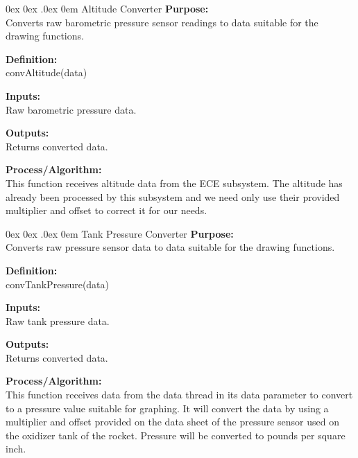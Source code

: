 \documentclass[10pt,draftclsnofoot,onecolumn,compsoc]{IEEEtran}
\makeatletter
\renewcommand\paragraph{\@startsection{paragraph}{4}{\z@}%
                                    {0ex \@plus0ex \@minus.0ex}%
                                    {0em}%
                                    {\normalfont\normalsize\bfseries}}
\makeatother
\begin{document}
\paragraph{Altitude Converter}
{\bf Purpose:} \\
Converts raw barometric pressure sensor readings to data suitable for the drawing functions.  \par
{\bf Definition:} \\ 
convAltitude(data) \par
{\bf Inputs:} \\ Raw barometric pressure data. \par
{\bf Outputs:} \\ Returns converted data. \par
{\bf Process/Algorithm:} \\
This function receives altitude data from the ECE subsystem. The altitude has already been processed by this subsystem and we need only use their provided multiplier and offset to correct it for our needs. \par

\paragraph{Tank Pressure Converter}
{\bf Purpose:} \\
Converts raw pressure sensor data to data suitable for the drawing functions.  \par
{\bf Definition:} \\ 
convTankPressure(data) \par
{\bf Inputs:} \\ Raw tank pressure data. \par
{\bf Outputs:} \\ Returns converted data. \par
{\bf Process/Algorithm:} \\
This function receives data from the data thread in its data parameter to convert to a pressure value suitable for graphing. It will convert the data by using a multiplier and offset provided on the data sheet of the pressure sensor used on the oxidizer tank of the rocket. Pressure will be converted to pounds per square inch. \par
\end{document}
